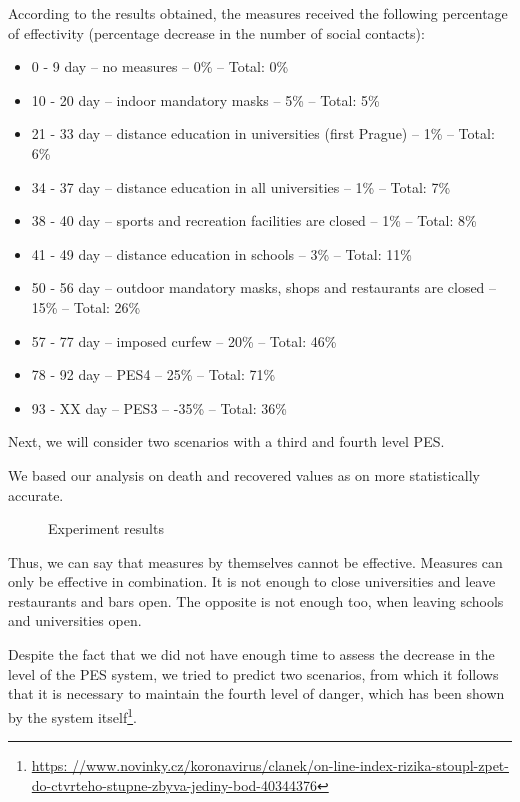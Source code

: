\documentclass[12pt,a4paper,english]{article}
\begin{document}
    According to the results obtained, the measures received the following percentage of effectivity (percentage decrease in the number of social contacts):
    \begin{itemize}
        \item 0 - 9   day -- no measures -- 0\% -- Total: 0\% 
        \item 10 - 20 day -- indoor mandatory  masks -- 5\% -- Total: 5\% 
        \item 21 - 33 day -- distance education in universities (first Prague) -- 1\% -- Total: 6\%
        \item 34 - 37 day -- distance education in all universities -- 1\% -- Total: 7\%
        \item 38 - 40 day -- sports and recreation facilities are closed -- 1\% -- Total: 8\%
        \item 41 - 49 day -- distance education in schools -- 3\% -- Total: 11\%
        \item 50 - 56 day -- outdoor mandatory masks, shops and restaurants are closed -- 15\% -- Total: 26\%
        \item 57 - 77 day -- imposed curfew -- 20\% -- Total: 46\%
        \item 78 - 92 day -- PES4 -- 25\% -- Total: 71\%
        \item 93 - XX day -- PES3 -- -35\% -- Total: 36\%
    \end{itemize}
    

    Next, we will consider two scenarios with a third and fourth level PES.
    
    We based our analysis on death and recovered values as on more statistically accurate.

    \begin{figure}[h!]
        \centering
        \hfill
        \caption{Experiment results}
    \end{figure}
    Thus, we can say that measures by themselves cannot be effective. 
    Measures can only be effective in combination. 
    It is not enough to close universities and leave restaurants and bars open. 
    The opposite is not enough too, when leaving schools and universities open.
         
    Despite the fact that we did not have enough time to assess the decrease in the level of the PES system, we tried to predict two scenarios, from which it follows that it is necessary to maintain the fourth level of danger, which has been shown by the system itself\footnote{\url{https: //www.novinky.cz/koronavirus/clanek/on-line-index-rizika-stoupl-zpet-do-ctvrteho-stupne-zbyva-jediny-bod-40344376}}.
    
\end{document}
